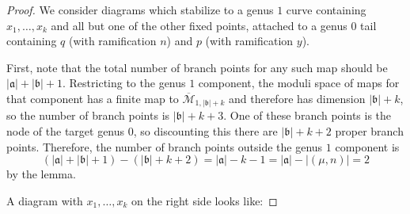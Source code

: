 \documentclass[11pt]{article}           %
\theoremstyle{definition}
\theoremstyle{definition}
\begin{document}
\begin{proof}
  We consider diagrams which stabilize to a genus $1$ curve containing $x_1,\dots,x_k$ and all but one
  of the other fixed points, attached to a genus $0$ tail containing $q$ (with ramification $n$) and $p$
  (with ramification $y$).

  First, note that the total number of branch points for any such map should be $|\mathfrak a|+|\mathfrak b|+1$.
  Restricting to the genus $1$ component, the moduli space of maps for that component has a finite map to $\overline{\mathcal M}_{1,|\mathfrak b|+k}$ and therefore has dimension $|\mathfrak b|+k$, so the number of branch points is $|\mathfrak b|+k+3$. One
  of these branch points is the node of the target genus $0$, so discounting this there are $|\mathfrak b|+k+2$ proper branch points.
  Therefore, the number of branch points outside the genus $1$ component is
  \[
  (|\mathfrak a|+|\mathfrak b|+1)-(|\mathfrak b|+k+2)=|\mathfrak a|-k-1=|\mathfrak a|-|(\mu,n)|=2
  \]
  by the lemma.
  
  A diagram with $x_1,\dots,x_k$ on the right side looks like:

\end{proof}
\end{document}
